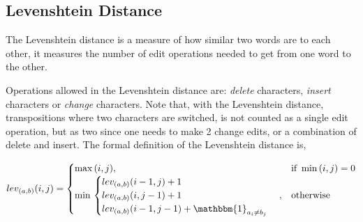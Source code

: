 %
%
%	
%	
%	
%
%	
%	


\subsection{Levenshtein Distance}
The Levenshtein distance is a measure of how similar two words are to each other, it measures the number of edit operations needed to get from one word to the other. 

Operations allowed in the Levenshtein distance are: \emph{delete} characters, \emph{insert} characters or \emph{change} characters. Note that, with the Levenshtein distance, transpositions where two characters are switched, is not counted as a single edit operation, but as two since one needs to make 2 change edits, or a combination of delete and insert. The formal definition of the Levenshtein distance is,

\begin{equation}  
lev_{(a,b)}(i,j) = 
	\begin{cases} 
		\max{(i,j)}, & \text{if}\ \min{(i,j) = 0} \\
		\min{} \begin{cases}
					lev_{(a,b)}(i-1,j) + 1 \\
					lev_{(a,b)}(i,j-1) + 1 \\
					lev_{(a,b)}(i-1,j-1) + \mathbbm{1}_{a_{i} \neq b_{j}} \\
				\end{cases} , & \text{otherwise}
	\end{cases}
\label{eq:levenshtein-def}
\end{equation}

